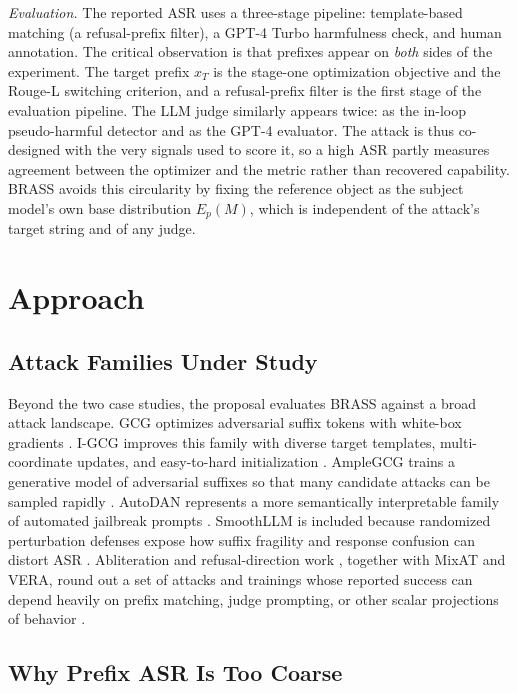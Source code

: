 \documentclass[conference]{IEEEtran}
\begin{document}
\emph{Evaluation.} The reported ASR uses a three-stage pipeline: template-based matching (a refusal-prefix filter), a GPT-4 Turbo harmfulness check, and human annotation. The critical observation is that prefixes appear on \emph{both} sides of the experiment. The target prefix \(x_T\) is the stage-one optimization objective and the Rouge-L switching criterion, and a refusal-prefix filter is the first stage of the evaluation pipeline. The LLM judge similarly appears twice: as the in-loop pseudo-harmful detector and as the GPT-4 evaluator. The attack is thus co-designed with the very signals used to score it, so a high ASR partly measures agreement between the optimizer and the metric rather than recovered capability. BRASS avoids this circularity by fixing the reference object as the subject model's own base distribution \(E_p(M)\), which is independent of the attack's target string and of any judge.

\section{Approach}

\subsection{Attack Families Under Study}

Beyond the two case studies, the proposal evaluates BRASS against a broad attack landscape. GCG optimizes adversarial suffix tokens with white-box gradients \cite{zou2023universal}. I-GCG improves this family with diverse target templates, multi-coordinate updates, and easy-to-hard initialization \cite{jia2024improved}. AmpleGCG trains a generative model of adversarial suffixes so that many candidate attacks can be sampled rapidly \cite{liao2024amplegcg}. AutoDAN represents a more semantically interpretable family of automated jailbreak prompts \cite{liu2023autodan}. SmoothLLM is included because randomized perturbation defenses expose how suffix fragility and response confusion can distort ASR \cite{robey2023smoothllm}. Abliteration and refusal-direction work \cite{arditi2024refusal}, together with MixAT and VERA, round out a set of attacks and trainings whose reported success can depend heavily on prefix matching, judge prompting, or other scalar projections of behavior \cite{mixat2024,vera2024}.

\subsection{Why Prefix ASR Is Too Coarse}
\end{document}
